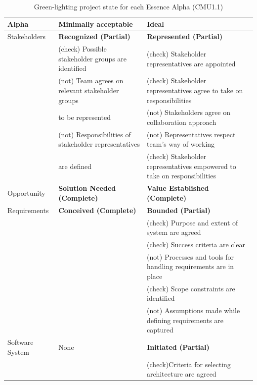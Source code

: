 \documentclass[conference]{IEEEtran}
\begin{document}
\begin{table}
\caption{Green-lighting project state for each Essence Alpha (CMU1.1)}
\label{GreenLightingProjectState}
\begin{tabular}{|l|p{2.50in}|p{3.35in}|}
\hline
\textbf{Alpha}  & \textbf{Minimally acceptable}       & \textbf{Ideal}                        \\ \hline
Stakeholders    & \textbf{Recognized (Partial)}       & \textbf{Represented (Partial)}        \\ 
                & (check) Possible stakeholder groups are identified & (check) Stakeholder representatives are appointed \\
                & (not) Team agrees on relevant stakeholder groups & (check) Stakeholder representatives agree to take on responsibilities \\
                & to be represented                 & (not) Stakeholders agree on collaboration approach \\
                & (not) Responsibilities of stakeholder representatives  & (not) Representatives respect team's way of working \\
                & are defined                         & (check) Stakeholder representatives empowered to take on responsibilities \\ \hline
Opportunity     & \textbf{Solution Needed (Complete)} & \textbf{Value Established (Complete)} \\[5ex] \hline
Requirements    & \textbf{Conceived (Complete)}       & \textbf{Bounded (Partial)}            \\
                &                                     & (check) Purpose and extent of system are agreed \\
                &                                     & (check) Success criteria are clear \\
                &                                     & (not) Processes and tools for handling requirements are in place \\
                &                                     & (check) Scope constraints are identified \\
                &                                     & (not) Assumptions made while defining requirements are captured \\ \hline
Software System & None                                & \textbf{Initiated (Partial)} \\
                &                                     & (check)Criteria for selecting architecture are agreed \\

\end{tabular}
\end{table}
\end{document}
